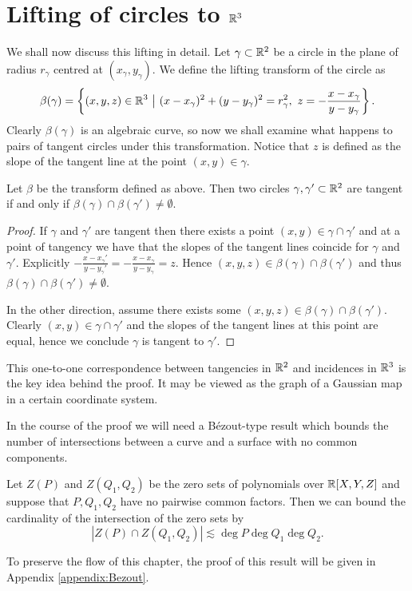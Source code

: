 \section{Lifting of circles to $\mathbb R^3$}

We shall now discuss this lifting in detail. Let $\gamma \subset \mathbb R^2$ be a circle in the plane of radius $r_{\gamma}$ centred at $(x_\gamma, y_\gamma)$. 
We define the lifting transform of the circle as \[
    \beta(\gamma) = \left \{ (x,y,z) \in \mathbb R^3 \ \big | \ (x-x_\gamma)^2 + (y-y_\gamma)^2 = r_\gamma^2, \ z = - \frac{x-x_\gamma}{y-y_\gamma} \right \}.
\]  
Clearly $\beta(\gamma)$ is an algebraic curve, so now we shall examine what happens to pairs of tangent circles under this transformation. Notice that $z$ is defined as the slope of the tangent line
at the point $(x,y) \in \gamma$.

\begin{lemma}
    Let $\beta$ be the transform defined as above. 
    Then two circles $\gamma, \gamma' \subset \mathbb R^2$ are tangent if and only if $\beta(\gamma) \cap \beta(\gamma') \neq \emptyset$.    \label{lem:beta-lift}
\end{lemma}
\begin{proof}
If $\gamma$ and $\gamma'$ are tangent then there exists a point $(x,y) \in \gamma \cap \gamma'$ and
at a point of tangency we have that the slopes of the tangent lines coincide for $\gamma$ and $\gamma'$. Explicitly $-\frac{x-x_\gamma'}{y - y_\gamma'}= -\frac{x-x_\gamma}{y - y_\gamma} = z$.
Hence $(x,y,z) \in \beta(\gamma) \cap \beta(\gamma')$ and thus $ \beta(\gamma) \cap \beta(\gamma') \neq \emptyset$.

In the other direction, assume there exists some $(x,y,z) \in \beta(\gamma) \cap \beta(\gamma')$. 
Clearly $(x,y) \in \gamma \cap \gamma'$ and the slopes of the tangent lines at this point are equal,
hence we conclude $\gamma$ is tangent to $\gamma'$.
\end{proof}
This one-to-one correspondence between tangencies in $\mathbb R^2$ and incidences in $\mathbb R^3$ is the key idea behind the proof. 
It may be viewed as the graph of a Gaussian map in a certain coordinate system.

In the course of the proof we will need a Bézout-type result which bounds the number of intersections between a curve and a surface with no common components.
\begin{lemma}     \label{lem:Bezout}
   Let $Z(P)$ and $Z(Q_1,Q_2)$ be the zero sets of polynomials over $\mathbb R[X,Y,Z]$ and suppose that $P,Q_1,Q_2$ have no pairwise common factors.
 Then we can bound the cardinality of the intersection of the zero sets by
    \[ |Z(P) \cap Z(Q_1,Q_2)| \lesssim \deg P \deg Q_1 \deg Q_2.\]
\end{lemma}
To preserve the flow of this chapter, the proof of this result will be given in Appendix \ref{appendix:Bezout}.

